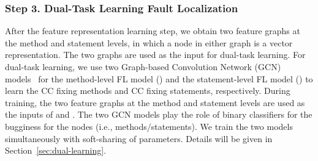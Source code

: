 



\subsubsection{Step 3. Dual-Task Learning Fault Localization}

After the feature representation learning step, we obtain two feature
graphs at the method and statement levels, in which a node in
either graph is a vector representation. The two graphs are used as
the input for dual-task learning. For dual-task learning, we use two
Graph-based Convolution Network (GCN) models~\cite{kipf2016semi} for
the method-level FL model () and the statement-level FL
model () to learn the CC fixing methods and CC fixing
statements, respectively. During training, the two feature graphs at
the method and statement levels are used as the inputs of
 and .
The two GCN models play the role of binary classifiers for the
bugginess for the nodes (i.e., methods/statements). We train the two
models simultaneously with soft-sharing of parameters. Details will
be given in Section~\ref{sec:dual-learning}.


